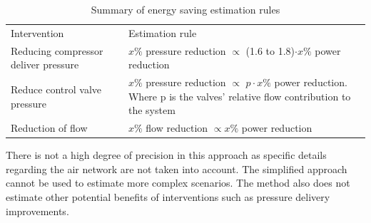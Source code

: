 		\begin{table}[h]
			\centering
			\caption[Summary of energy saving estimation rules]{Summary of energy saving estimation rules \cite{Marais2012PhD}}\hspace{2em}
			\begin{tabular}{p{}p{}p{}}
				\hline
				Intervention && Estimation rule\\
				\hhline{===} 
				Reducing compressor deliver pressure & & $x \%$ pressure reduction $\propto$ (1.6 to 1.8)$\cdot x\%$ power reduction \newline \\
				Reduce control valve pressure & &$x \%$ pressure reduction $\propto$ $p\cdot x\%$ power reduction. \newline \newline Where p is the valves' relative flow contribution to the system \newline \\
				Reduction of flow && $x \%$ flow reduction $\propto x \%$ power reduction \newline\\
				\hline
			\end{tabular} 
			\label{table: Rules of thumb}
		\end{table}
		There is not a high degree of precision in this approach as specific details regarding the air network are not taken into account. The simplified approach cannot be used to estimate more complex scenarios. The method also does not estimate other potential benefits of interventions such as pressure delivery improvements.
		
